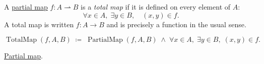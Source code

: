 \NoLocalDependencies

\begin{definition}
\label{def:total-map}
A \hyperref[def:partial-map]{partial map} $f : A \rightharpoonup B$ is a
\emph{total map} if it is defined on every element of $A$:
\[
\forall x \in A,\; \exists y \in B,\quad (x, y) \in f.
\]
A total map is written $f : A \to B$ and is precisely a function in the
usual sense.
\end{definition}

\begin{remark*}
\[
\operatorname{TotalMap}(f, A, B)
\;\coloneqq\;
\operatorname{PartialMap}(f, A, B)
\;\land\;
\forall x \in A,\; \exists y \in B,\; (x, y) \in f.
\]
\end{remark*}

\begin{remark*}[Dependencies]
\hyperref[def:partial-map]{Partial map}.
\end{remark*}
